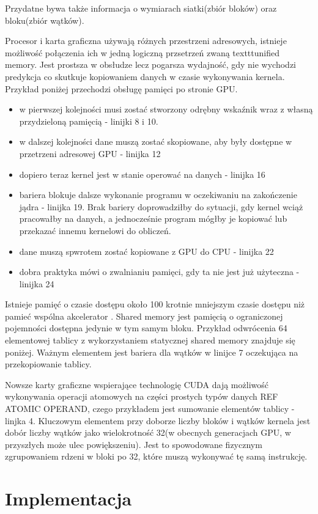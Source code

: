Przydatne bywa także informacja o wymiarach siatki(zbiór bloków) oraz bloku(zbiór wątków).


Procesor i karta graficzna używają różnych przestrzeni adresowych, istnieje możliwość połączenia ich w jedną logiczną przsetrzeń zwaną texttt{unified memory}. Jest prostsza w obsłudze lecz pogarsza wydajność, gdy nie wychodzi predykcja co skutkuje kopiowaniem danych w czasie wykonywania kernela. Przykład poniżej przechodzi obsługę pamięci po stronie GPU.
\begin{itemize}
\item w pierwszej kolejności musi zostać stworzony odrębny wskaźnik wraz z własną przydzieloną pamięcią - linijki 8 i 10.
\item w dalszej kolejności dane muszą zostać skopiowane, aby były dostępne w przetrzeni adresowej GPU - linijka 12
\item dopiero teraz kernel jest w stanie operować na danych - linijka 16
\item bariera blokuje dalsze wykonanie programu w oczekiwaniu na zakończenie jądra - linijka 19. Brak bariery doprowadziłby do sytuacji, gdy kernel wciąż pracowałby na danych, a jednocześnie program mógłby je kopiować lub przekazać innemu kernelowi do obliczeń.
\item dane muszą spwrotem zostać kopiowane z GPU do CPU - linijka 22
\item dobra praktyka mówi o zwalnianiu pamięci, gdy ta nie jest już użyteczna - linijka 24
\end{itemize}


Istnieje pamięć o czasie dostępu około 100 krotnie mniejszym czasie dostępu niż pamieć wspólna akcelerator \cite{Sha13}. Shared memory jest pamięcią o ograniczonej pojemności dostępna jedynie w tym samym bloku. Przykład odwrócenia 64 elementowej tablicy z wykorzystaniem statycznej shared memory znajduje się poniżej. Ważnym elementem jest bariera dla wątków w linijce 7 oczekująca na przekopiowanie tablicy.


Nowsze karty graficzne wspierające technologię CUDA dają możliwość wykonywania operacji atomowych na części prostych typów danych REF ATOMIC OPERAND, czego przykładem jest sumowanie elementów tablicy - linjka 4. Kluczowym elementem przy doborze liczby bloków i wątków kernela jest dobór liczby wątków jako wielokrotność 32(w obecnych generacjach GPU, w przyszłych może ulec powiększeniu). Jest to spowodowane fizycznym zgrupowaniem rdzeni w bloki po 32, które muszą wykonywać tę samą instrukcję. 


\section{Implementacja}
\label{sec:implementacja}